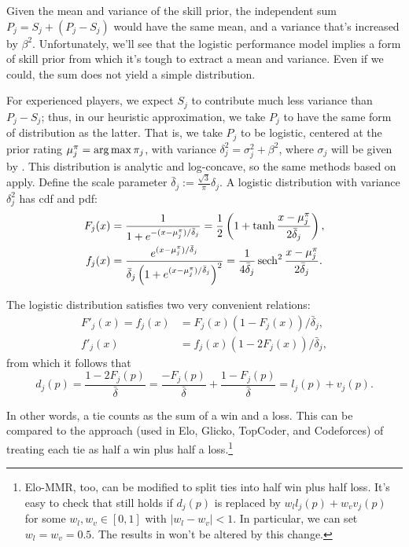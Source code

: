 Given the mean and variance of the skill prior, the independent sum $P_j = S_j + (P_j-S_j)$ would have the same mean, and a variance that's increased by $\beta^2$. Unfortunately, we'll see that the logistic performance model implies a form of skill prior from which it's tough to extract a mean and variance. Even if we could, the sum does not yield a simple distribution.

For experienced players, we expect $S_j$ to contribute much less variance than $P_j-S_j$; thus, in our heuristic approximation, we take $P_j$ to have the same form of distribution as the latter. That is, we take $P_j$ to be logistic, centered at the prior rating $\mu^\pi_j = \operatorname*{arg\,max} \pi_j$, with variance $\delta_j^2 = \sigma_j^2 + \beta^2$, where $\sigma_j$ will be given by . This distribution is analytic and log-concave, so the same methods based on  apply. 
Define the scale parameter $\bar\delta_j := \frac{\sqrt{3}}{\pi} \delta_j$. A logistic distribution with variance $\delta_j^2$ has cdf and pdf:
\begin{align*}
F_j(x) &= \frac { 1 } { 1 + e^{-(x-\mu^\pi_j)/\bar\delta_j} }
= \frac 12 \left(1 + \tanh\frac{x-\mu^\pi_j}{2\bar\delta_j} \right),
\\f_j(x) &= \frac { e^{(x-\mu^\pi_j)/\bar\delta_j} } { \bar\delta_j\left( 1 + e^{(x-\mu^\pi_j)/\bar\delta_j} \right)^2}
= \frac { 1 } { 4\bar\delta_j} \operatorname{sech}^2\frac{x-\mu^\pi_j}{2\bar\delta_j}.
\end{align*}

The logistic distribution satisfies two very convenient relations:
\begin{align*}
F'_j(x) = f_j(x) &= F_j(x) (1 - F_j(x)) / \bar\delta_j,
\\f'_j(x) &= f_j(x) (1 - 2F_j(x)) / \bar\delta_j,
\end{align*}
from which it follows that
\[d_j(p)
= \frac{1 - 2F_j(p)}{\bar\delta}
= \frac{-F_j(p)}{\bar\delta} + \frac{1 - F_j(p)}{\bar\delta}
= l_j(p) + v_j(p).\]

In other words, a tie counts as the sum of a win and a loss. This can be compared to the approach (used in Elo, Glicko, TopCoder, and Codeforces) of treating each tie as half a win plus half a loss.\footnote{Elo-MMR, too, can be modified to split ties into half win plus half loss. It's easy to check that  still holds if $d_j(p)$ is replaced by
$w_l l_j(p) + w_v v_j(p)$
for some $w_l,w_v\in [0,1]$ with $|w_l-w_v|<1$.
In particular, we can set $w_l=w_v=0.5$. The results in  won't be altered by this change.}


